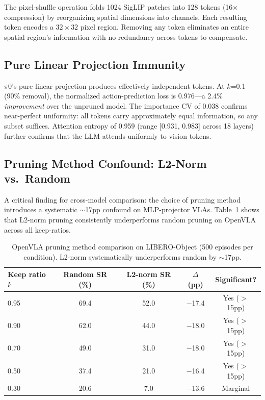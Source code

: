 \documentclass[letterpaper]{article}
\begin{document}
The pixel-shuffle operation folds 1024 SigLIP patches into 128 tokens (16$\times$ compression) by reorganizing spatial dimensions into channels.
Each resulting token encodes a $32 \times 32$ pixel region.
Removing any token eliminates an entire spatial region's information with no redundancy across tokens to compensate.

\subsection{Pure Linear Projection Immunity}
\label{sec:linear}

$\pi$0's pure linear projection produces effectively independent tokens.
At $k$=0.1 (90\% removal), the normalized action-prediction loss is 0.976---a 2.4\% \emph{improvement} over the unpruned model.
The importance CV of 0.038 confirms near-perfect uniformity: all tokens carry approximately equal information, so any subset suffices.
Attention entropy of 0.959 (range [0.931, 0.983] across 18 layers) further confirms that the LLM attends uniformly to vision tokens.

\subsection{Pruning Method Confound: L2-Norm vs.\ Random}
\label{sec:confound}

A critical finding for cross-model comparison: the choice of pruning method introduces a systematic $\sim$17pp confound on MLP-projector VLAs.
Table~\ref{tab:method_confound} shows that L2-norm pruning consistently underperforms random pruning on OpenVLA across all keep-ratios.

\begin{table}[h]
\centering
\caption{OpenVLA pruning method comparison on LIBERO-Object (500 episodes per condition). L2-norm systematically underperforms random by $\sim$17pp.}
\label{tab:method_confound}
\begin{tabular}{lcccc}
\toprule
\textbf{Keep ratio $k$} & \textbf{Random SR (\%)} & \textbf{L2-norm SR (\%)} & \textbf{$\Delta$ (pp)} & \textbf{Significant?} \\
\midrule
0.95 & 69.4 & 52.0 & $-$17.4 & Yes ($>$15pp) \\
0.90 & 62.0 & 44.0 & $-$18.0 & Yes ($>$15pp) \\
0.70 & 49.0 & 31.0 & $-$18.0 & Yes ($>$15pp) \\
0.50 & 37.4 & 21.0 & $-$16.4 & Yes ($>$15pp) \\
0.30 & 20.6 & 7.0 & $-$13.6 & Marginal \\
\bottomrule
\end{tabular}
\end{table}
\end{document}
